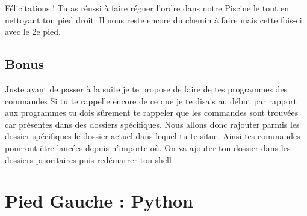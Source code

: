 \documentclass[a4paper, 12pt]{article}
\begin{document}
{    

    \vspace{6cm}


    Félicitations !
    Tu as réussi à faire régner l'ordre dans notre Piscine le tout en nettoyant ton pied droit.
    Il nous reste encore du chemin à faire mais cette fois-ci avec le 2e pied.

    \vspace{2cm}
    
    \subsection{Bonus}
    Juste avant de passer à la suite je te propose de faire de tes programmes des commandes
    Si tu te rappelle encore de ce que je te disais au début par rapport aux programmes
    tu dois sûrement te rappeler que les commandes sont trouvées car présentes dans des dossiers
    spécifiques. Nous allons donc rajouter parmis les dossier spécifiques le dossier actuel dans lequel tu
    te situe. Ainsi tes commandes pourront être lancées depuis n'importe où.
    \newline \newline
    On va ajouter ton dossier dans les dossiers prioritaires puis redémarrer ton shell

    \vspace{4cm}
}


\section{Pied Gauche : Python}
\end{document}

